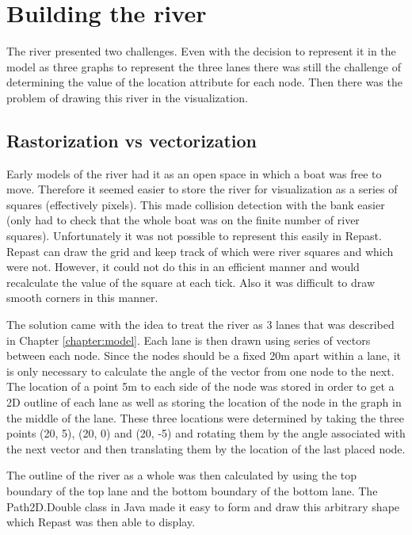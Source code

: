   \section{Building the river}\label{techissues:river}
    The river presented two challenges. Even with the decision to represent it in the model as three graphs to represent the three lanes there was still the challenge of determining the value of the location attribute for each node. Then there was the problem of drawing this river in the visualization.
    
    \subsection{Rastorization vs vectorization}
      Early models of the river had it as an open space in which a
      boat was free to move. Therefore it seemed easier to store the
      river for visualization as a series of squares (effectively
      pixels). This made collision detection with the bank easier
      (only had to check that the whole boat was on the finite number
      of river squares). Unfortunately it was not possible to
      represent this easily in Repast. Repast can draw the grid and
      keep track of which were river squares and which were
      not. However, it could not do this in an efficient manner and
      would recalculate the value of the square at each tick. Also it
      was difficult to draw smooth corners in this manner.
      
      The solution came with the idea to treat the river as 3 lanes that was described in Chapter \ref{chapter:model}. Each lane is then drawn using series of vectors between each node. Since the nodes should be a fixed 20m apart within a lane, it is only necessary to calculate the angle of the vector from one node to the next. The location of a point 5m to each side of the node was stored in order to get a 2D outline of each lane as well as storing the location of the node in the graph in the middle of the lane. These three locations were determined by taking the three points (20, 5), (20, 0) and (20, -5) and rotating them by the angle associated with the next vector and then translating them by the location of the last placed node. 
      
      The outline of the river as a whole was then calculated by using the top boundary of the top lane and the bottom boundary of the bottom lane. The Path2D.Double class in Java made it easy to form and draw this arbitrary shape which Repast was then able to display. 
      
